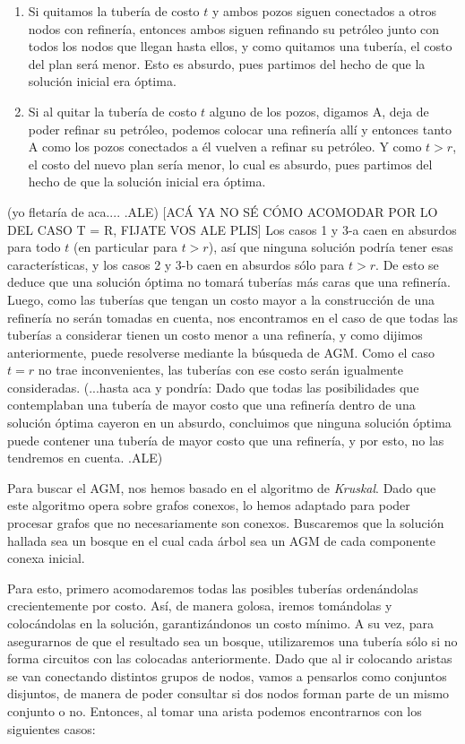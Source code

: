 \begin{enumerate}
	\begin{enumerate}
		\item Si quitamos la tubería de costo $t$ y ambos pozos siguen conectados a otros nodos con refinería, entonces ambos siguen refinando su petróleo junto con todos los nodos que llegan hasta ellos, y como quitamos una tubería, el costo del plan será menor.  Esto es absurdo, pues partimos del hecho de que la solución inicial era óptima.
		\item Si al quitar la tubería de costo $t$ alguno de los pozos, digamos A, deja de poder refinar su petróleo, podemos colocar una refinería allí y entonces tanto A como los pozos conectados a él vuelven a refinar su petróleo. Y como $t > r$, el costo del nuevo plan sería menor, lo cual es absurdo, pues partimos del hecho de que la solución inicial era óptima.
	\end{enumerate}
	
\end{enumerate}

(yo fletaría de aca.... .ALE)
[ACÁ YA NO SÉ CÓMO ACOMODAR POR LO DEL CASO T = R, FIJATE VOS ALE PLIS]
Los casos 1 y 3-a caen en absurdos para todo $t$ (en particular para $t > r$), así que ninguna solución podría tener esas características, y los casos 2 y 3-b caen en absurdos sólo para $t > r$. De esto se deduce que una solución óptima no tomará tuberías más caras que una refinería. Luego, como las tuberías que tengan un costo mayor a la construcción de una refinería no serán tomadas en cuenta, nos encontramos en el caso de que todas las tuberías a considerar tienen un costo menor a una refinería, y como dijimos anteriormente, puede resolverse mediante la búsqueda de AGM.  Como el caso $t = r$ no trae inconvenientes, las tuberías con ese costo serán igualmente consideradas.
(...hasta aca y pondría: Dado que todas las posibilidades que contemplaban una tubería de mayor costo que una refinería dentro de una solución óptima cayeron en un absurdo, concluimos que ninguna solución óptima puede contener una tubería de mayor costo que una refinería, y por esto, no las tendremos en cuenta. .ALE)

Para buscar el AGM, nos hemos basado en el algoritmo de {\it Kruskal}.  Dado que este algoritmo opera sobre grafos conexos, lo hemos adaptado para poder procesar grafos que no necesariamente son conexos. Buscaremos que la solución hallada sea un bosque en el cual cada árbol sea un AGM de cada componente conexa inicial.

Para esto, primero acomodaremos todas las posibles tuberías ordenándolas crecientemente por costo. Así, de manera golosa, iremos tomándolas y colocándolas en la solución, garantizándonos un costo mínimo. A su vez, para asegurarnos de que el resultado sea un bosque, utilizaremos una tubería sólo si no forma circuitos con las colocadas anteriormente. Dado que al ir colocando aristas se van conectando distintos grupos de nodos, vamos a pensarlos como conjuntos disjuntos, de manera de poder consultar si dos nodos forman parte de un mismo conjunto o no.  Entonces, al tomar una arista podemos encontrarnos con los siguientes casos:

